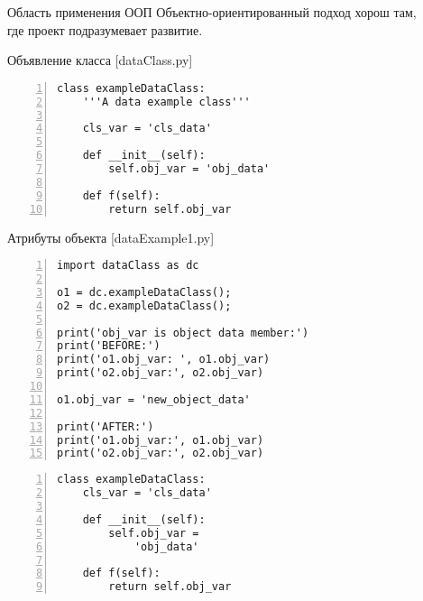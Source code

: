 \documentclass[hyperref={pdftex,unicode}]{beamer}
\begin{document}
\begin{frame}{Область применения ООП}
  Объектно-ориентированный подход хорош там, \\
  где проект подразумевает развитие.
\end{frame}


\begin{frame}[fragile]{Объявление класса [dataClass.py]}
    \begin{lstlisting}[numbers=left]
class exampleDataClass:
    '''A data example class'''

    cls_var = 'cls_data'

    def __init__(self):
        self.obj_var = 'obj_data'

    def f(self):
        return self.obj_var
    \end{lstlisting}
\end{frame}

\begin{frame}[fragile]{Атрибуты объекта [dataExample1.py]}
\begin{minipage}{0.62\linewidth}
    \begin{lstlisting}[numbers=left,basicstyle=\scriptsize\ttfamily]
import dataClass as dc

o1 = dc.exampleDataClass();
o2 = dc.exampleDataClass();

print('obj_var is object data member:')
print('BEFORE:')
print('o1.obj_var: ', o1.obj_var)
print('o2.obj_var:', o2.obj_var)

o1.obj_var = 'new_object_data'

print('AFTER:')
print('o1.obj_var:', o1.obj_var)
print('o2.obj_var:', o2.obj_var)
    \end{lstlisting}
\end{minipage}
\hfill
\begin{minipage}{0.35\linewidth}
    \begin{lstlisting}[numbers=left,basicstyle=\tiny\ttfamily,numbers=none]
class exampleDataClass:
    cls_var = 'cls_data'

    def __init__(self):
        self.obj_var =
            'obj_data'

    def f(self):
        return self.obj_var
    \end{lstlisting}
\end{minipage}
\end{frame}
\end{document}
